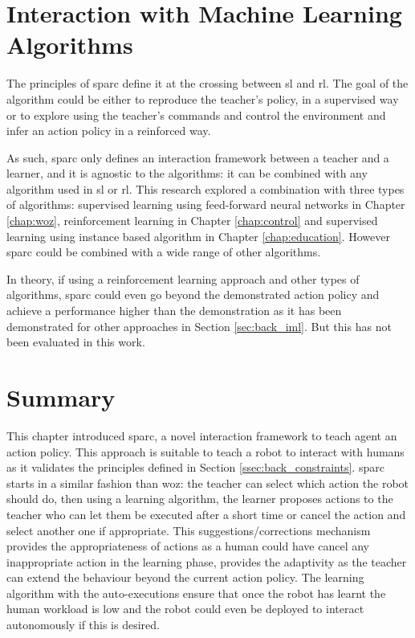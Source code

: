 \section{Interaction with Machine Learning Algorithms}

The principles of \gls{sparc} define it at the crossing between \acrlong{sl} and \acrlong{rl}. The  goal of the algorithm could be either to reproduce the teacher's policy, in a supervised way or to explore using the teacher's commands and control the environment and infer an action policy in a reinforced way.

As such, \gls{sparc} only defines an interaction framework between a teacher and a learner, and it is agnostic to the algorithms: it can be combined with any algorithm used in \acrlong{sl} or \acrlong{rl}. This research explored a combination with three types of algorithms: supervised learning using feed-forward neural networks in Chapter \ref{chap:woz}, reinforcement learning in Chapter \ref{chap:control} and supervised learning using instance based algorithm in Chapter \ref{chap:education}. However \gls{sparc} could be combined with a wide range of other algorithms.

In theory, if using a reinforcement learning approach and other types of algorithms, \gls{sparc} could even go beyond the demonstrated action policy and achieve a performance higher than the demonstration as it has been demonstrated for other approaches in Section \ref{sec:back_iml}. But this has not been evaluated in this work.

\section{Summary}
    
This chapter introduced \acrfull{sparc}, a novel interaction framework to teach agent an action policy. This approach is suitable to teach a robot to interact with humans as it validates the principles defined in Section \ref{ssec:back_constraints}. \gls{sparc} starts in a similar fashion than \gls{woz}: the teacher can select which action the robot should do, then using a learning algorithm, the learner proposes actions to the teacher who can let them be executed after a short time or cancel the action and select another one if appropriate. This suggestions/corrections mechanism provides the appropriateness of actions as a human could have cancel any inappropriate action in the learning phase, provides the adaptivity as the teacher can extend the behaviour beyond the current action policy. The learning algorithm with the auto-executions ensure that once the robot has learnt the human workload is low and the robot could even be deployed to interact autonomously if this is desired.

